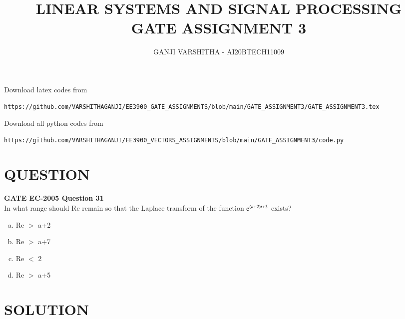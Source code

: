 \documentclass[journal,12pt,twocolumn]{IEEEtran}
\begin{document}
\let\vec\mathbf
\renewcommand{\thefigure}{\theproblem}
\def\putbox#1#2#3{\makebox[0in][l]{\makebox[#1][l]{}\raisebox{\baselineskip}[0in][0in]{\raisebox{#2}[0in][0in]{#3}}}}
     \def\rightbox#1{\makebox[0in][r]{#1}}
     \def\centbox#1{\makebox[0in]{#1}}
     \def\topbox#1{\raisebox{-\baselineskip}[0in][0in]{#1}}
     \def\midbox#1{\raisebox{-0.5\baselineskip}[0in][0in]{#1}}
\vspace{3cm}
\title{\textbf{LINEAR SYSTEMS AND SIGNAL PROCESSING \\ GATE ASSIGNMENT 3}}
\author{GANJI VARSHITHA - AI20BTECH11009}
\maketitle
\newpage
\bigskip
\renewcommand{\thefigure}{\arabic{figure}}
\renewcommand{\thetable}{\arabic{table}}
Download latex codes from 
%
\begin{lstlisting}
https://github.com/VARSHITHAGANJI/EE3900_GATE_ASSIGNMENTS/blob/main/GATE_ASSIGNMENT3/GATE_ASSIGNMENT3.tex
\end{lstlisting}

Download all python codes from
\begin{lstlisting}
https://github.com/VARSHITHAGANJI/EE3900_VECTORS_ASSIGNMENTS/blob/main/GATE_ASSIGNMENT3/code.py
\end{lstlisting}

\section*{QUESTION}
\textbf{GATE EC-2005 Question 31}
\\
In what range should Re remain so that the Laplace transform of the function $\text{e}^{\left(a+2\right)t+5}$ exists?

\begin{enumerate}[(a)]
   \item  Re $>$ a+2
   \item  Re $>$ a+7
   \item  Re $<$ 2
   \item  Re $>$ a+5
   
\end{enumerate}
\section*{SOLUTION}
\end{document}
